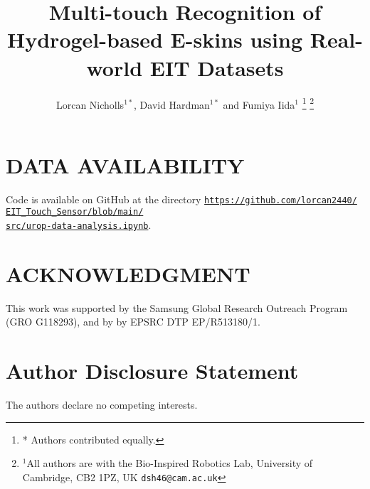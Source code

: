 \documentclass[letterpaper, 10 pt, conference]{ieeeconf}  %
\title{\LARGE \bf
Multi-touch Recognition of Hydrogel-based E-skins using Real-world EIT Datasets}
\author{Lorcan Nicholls$^{1*}$, David Hardman$^{1*}$ and Fumiya Iida$^{1}$%
\thanks{* Authors contributed equally.}
\thanks{$^{1}$All authors are with the Bio-Inspired Robotics Lab, University of Cambridge, CB2 1PZ, UK
        {\tt\small dsh46@cam.ac.uk}}%
}
\begin{document}
\maketitle
\thispagestyle{empty}
\pagestyle{empty}












\FloatBarrier

\section*{DATA AVAILABILITY}
Code is available on GitHub at the directory {\tt \href{https://github.com/lorcan2440/EIT\_Touch\_Sensor/blob/main/src/urop-data-analysis.ipynb}{https://github.com/lorcan2440/ \\ EIT\_Touch\_Sensor/blob/main/ \\ src/urop-data-analysis.ipynb}}.

\section*{ACKNOWLEDGMENT}
This work was supported by the Samsung Global Research Outreach Program (GRO G118293), and by by EPSRC DTP EP/R513180/1.

\section*{Author Disclosure Statement}
The authors declare no competing interests.



\end{document}
